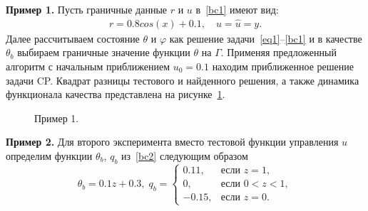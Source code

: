 \textbf{Пример 1.}
Пусть граничные данные $r$ и $u$ в~\eqref{bc1} имеют вид:
\begin{gather*}
    r = 0.8 cos(x) + 0.1,\quad
    u = \hat u = y.
\end{gather*}
Далее рассчитываем состояние $\theta$ и $\varphi$ как решение задачи~\eqref{eq1}--\eqref{bc1} и в качестве
$\theta_b$ выбираем граничные значение функции $\theta$ на $\Gamma$.
Применяя предложенный алгоритм с начальным приближением $u_0 = 0.1$ находим приближенное решение задачи CP\@.
Квадрат разницы тестового и найденного решения,
а также динамика функционала качества представлена на рисунке~\ref{img_test_1}.

\begin{figure}[H]
    \centering
    \caption{Пример 1.}
    \label{img_test_1}
\end{figure}

\textbf{Пример 2.}
Для второго эксперимента вместо тестовой функции управления $u$
определим функции $\theta_b$, $q_b$ из~\eqref{bc2} следующим образом
\[
    \theta_b = 0.1z + 0.3, \;
    q_b =
    \begin{cases}
        0.11, & \text{если } z = 1,\\
        0, & \text{если } 0 < z < 1,\\
        -0.15, & \text{если } z = 0.
    \end{cases}
\]

